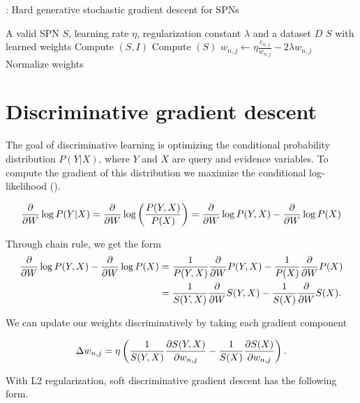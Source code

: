 \begin{algorithm}[H]
  \caption{: Hard generative stochastic gradient descent for SPNs\label{alg:gen_hard_gd}}
  \begin{algorithmic}[1]
    \Require A valid SPN $S$, learning rate $\eta$, regularization constant $\lambda$ and a dataset $D$
    \Ensure $S$ with learned weights
    \Repeat%
        \State Compute $(S, I)$
        \State Compute $(S)$
          \State $w_{n,j}\gets\eta\frac{c_{n,j}}{w_{n,j}}-2\lambda w_{n,j}$
        \EndFor%
        \State Normalize weights
      \EndFor%
  \end{algorithmic}
\end{algorithm}

\section{Discriminative gradient descent}

The goal of discriminative learning is optimizing the conditional probability distribution
$P(Y|X)$, where $Y$ and $X$ are query and evidence variables. To compute the gradient of this
distribution we maximize the conditional log-likelihood (\cite{discriminative}).

\begin{equation*}
  \frac{\partial}{\partial W}\log P(Y|X)=\frac{\partial}{\partial W}\log\left(\frac{P(Y,X)}{P(X)}\right)=
    \frac{\partial}{\partial W}\log P(Y,X)-\frac{\partial}{\partial W}\log P(X)
\end{equation*}

Through chain rule, we get the form
\begin{align*}
  \frac{\partial}{\partial W}\log P(Y,X)-\frac{\partial}{\partial W}\log P(X)&=\frac{1}{P(Y,X)}\frac{\partial}{\partial W}P(Y,X)-\frac{1}{P(X)}
    \frac{\partial}{\partial W}P(X)\\
    &=\frac{1}{S(Y,X)}\frac{\partial}{\partial W}S(Y,X)-\frac{1}{S(X)}\frac{\partial}{\partial W}S(X).
\end{align*}

We can update our weights discriminatively by taking each gradient component

\begin{equation*}
  \Delta w_{n,j}=\eta\left(\frac{1}{S(Y,X)}\frac{\partial S(Y,X)}{\partial w_{n,j}}-\frac{1}{S(X)}
    \frac{\partial S(X)}{\partial w_{n,j}}\right).
\end{equation*}

With L2 regularization, soft discriminative gradient descent has the following form.

